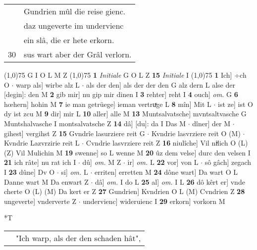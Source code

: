 \documentclass[8pt,a4paper,notitlepage]{article}
\begin{document}
\begin{table}[ht]
\begin{minipage}[t]{0.5\linewidth}
\begin{tabular}{rl}
 & Gundrien mûl die reise gienc.\\ 
 & daz ungeverte im undervienc\\ 
 & ein slâ, die er hete erkorn.\\ 
30 & sus wart aber der Grâl verlorn.\\ 
\end{tabular}
\scriptsize
\line(1,0){75} \newline
G I O L M Z \newline
\line(1,0){75} \newline
\textbf{1} \textit{Initiale} G O L Z  \textbf{15} \textit{Initiale} I  \newline
\line(1,0){75} \newline
\textbf{1} Ich] ÷ch O  $\cdot$ warp als] wirbe alz L  $\cdot$ als der den] als der der den G alz dern L alse der [degin]: den M \textbf{2} gib mir] nu gip mir dinen I \textbf{3} rehter] reht I \textbf{4} ouch] \textit{om.} G \textbf{6} hœhern] hohin M \textbf{7} ie man getrüege] ieman vertruͯge L \textbf{8} mîn] Mit L  $\cdot$ ist ze] ist O dy ist zcu M \textbf{9} dir] mir L \textbf{10} aller] alle M \textbf{13} Muntsalvatsche] mvntsaltvasche G Muntshalvasche I montsalvatsche Z \textbf{14} dâ] [du]: da I Das M  $\cdot$ dîner] der M  $\cdot$ gihest] vergihst Z \textbf{15} Gvndrîe lasurziere reit G  $\cdot$ Kvndrie lasvrziere reit O (M)  $\cdot$ Kvndrie Lazvrzirie reit L  $\cdot$ Cvndrie lasvrziere reit Z \textbf{16} niulîche] Vil niͮlich O (L) (Z) Vil Mulichin M \textbf{19} swenne] so L wenne M \textbf{20} ûz dem velse] durc den velsen I \textbf{21} ich râte] nu rat ich I  $\cdot$ dû] \textit{om.} M Z  $\cdot$ ir] \textit{om.} L \textbf{22} vor] von L  $\cdot$ sô gâch] zegach I \textbf{23} dûne] Dv O  $\cdot$ si] \textit{om.} L  $\cdot$ erriten] erretten M \textbf{24} dône wart] Da wart O L Danne wart M Da enwart Z  $\cdot$ dâ] \textit{om.} I do L \textbf{25} al] \textit{om.} I L \textbf{26} dô kêrt er] vnde cherte O (L) (M) Da kert er Z \textbf{27} Gundrien] Kvndrien O L (M) Cvndrien Z \textbf{28} ungeverte] vnderverte Z  $\cdot$ undervienc] wideruienc I \textbf{29} erkorn] vorkorn M \newline
\end{minipage}
\hspace{0.5cm}
\begin{minipage}[t]{0.5\linewidth}
\small
\begin{center}*T
\end{center}
\begin{tabular}{rl}
 & "Ich warp, als der den schaden hât",\\ 

\end{tabular}
\end{minipage}
\end{table}
\end{document}
